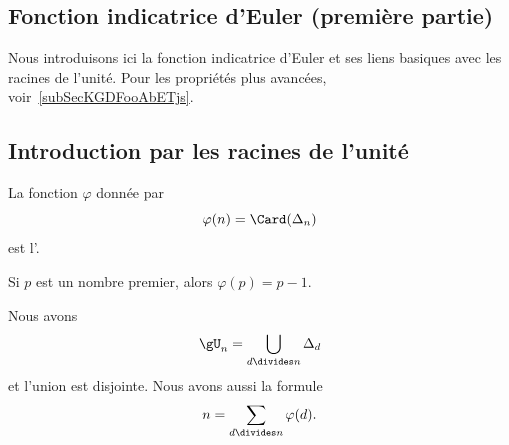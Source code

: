 \subsection{Fonction indicatrice d'Euler (première partie)}

Nous introduisons ici la fonction indicatrice d'Euler et ses liens basiques avec les racines de l'unité. Pour les propriétés plus avancées, voir~\ref{subSecKGDFooAbETjs}.

\subsection{Introduction par les racines de l'unité}

\begin{definition}      \label{DEFooWYIGooRVBTil}
La fonction \( \varphi\) donnée par
\begin{equation}    \label{EqEulerGqPsvi}
    \varphi(n)=\Card(\Delta_n)
\end{equation}
est l'.
\end{definition}
Si \( p\) est un nombre premier, alors \( \varphi(p)=p-1\).

\begin{lemma}       \label{LemKcpjee}
    Nous avons
    \begin{equation}        \label{EqpZuIyL}
        \gU_n=\bigcup_{d\divides n}\Delta_d
    \end{equation}
    et l'union est disjointe. Nous avons aussi la formule
    \begin{equation}        \label{EqTPHqgJ}
        n=\sum_{d\divides n}\varphi(d).
    \end{equation}
\end{lemma}

